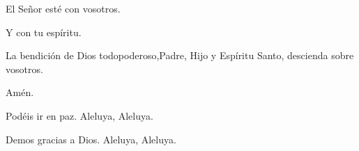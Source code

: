 \pr El Señor esté con vosotros.

\be Y con tu espíritu.

\pr La bendición de Dios todopoderoso,Padre, Hijo y Espíritu Santo, descienda sobre vosotros.

\be Amén.

\pr Podéis ir en paz. Aleluya, Aleluya.

\be Demos gracias a Dios. Aleluya, Aleluya.